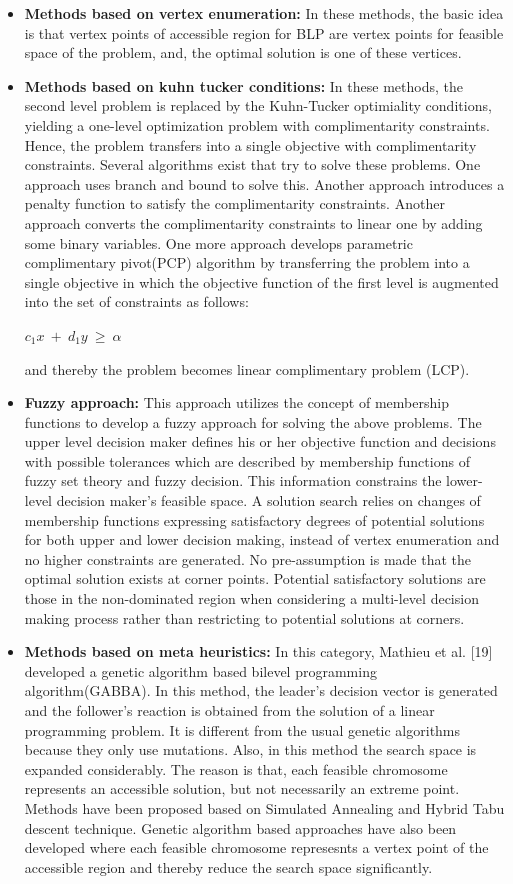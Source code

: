 \documentclass[a4paper, 12pt]{article}
\begin{document}
\begin{itemize}
\item \textbf{Methods based on vertex enumeration:} In these methods, the basic idea is that vertex points of accessible region for BLP are vertex points for feasible space of the problem, and, the optimal solution is one of these vertices.
\item \textbf{Methods based on kuhn tucker conditions:} In these methods, the second level problem is replaced by the Kuhn-Tucker optimiality conditions, yielding a one-level optimization problem with complimentarity constraints. Hence, the problem transfers into a single objective with complimentarity constraints. Several algorithms exist that try to solve these problems. One approach uses branch and bound to solve this. Another approach introduces a penalty function to satisfy the complimentarity constraints. Another approach converts the complimentarity constraints to linear one by adding some binary variables. One more approach develops parametric complimentary pivot(PCP) algorithm by transferring the problem into a single objective in which the objective function of the first level is augmented into the set of constraints as follows:\\
\begin{center}
$c_{1}x\ +\ d_{1}y\ \geq\ \alpha$
\end{center}
and thereby the problem becomes linear complimentary problem (LCP).
\item \textbf{Fuzzy approach:} This approach utilizes the concept of membership functions to develop a fuzzy approach for solving the above problems. The upper level decision maker defines his or her objective function and decisions with possible tolerances which are described by membership functions of fuzzy set theory and fuzzy decision. This information constrains the lower-level decision maker's feasible space. A solution search relies on changes of membership functions expressing satisfactory degrees of potential solutions for both upper and lower decision making, instead of vertex enumeration and no higher constraints are generated. No pre-assumption is made that the optimal solution exists at corner points. Potential satisfactory solutions are those in the non-dominated region when considering a multi-level decision making process rather than restricting to potential solutions at corners.
\item \textbf{Methods based on meta heuristics:} In this category, Mathieu et al. [19] developed a genetic algorithm based bilevel programming algorithm(GABBA). In this method, the leader's decision vector is generated and the follower's reaction is obtained from the solution of a linear programming problem. It is different from the usual genetic algorithms because they only use mutations. Also, in this method the search space is expanded considerably. The reason is that, each feasible chromosome represents an accessible solution, but not necessarily an extreme point. Methods have been proposed based on Simulated Annealing and Hybrid Tabu descent technique. Genetic algorithm based approaches have also been developed where each feasible chromosome represesnts a vertex point of the accessible region and thereby reduce the search space significantly.

\end{itemize}
\end{document}
